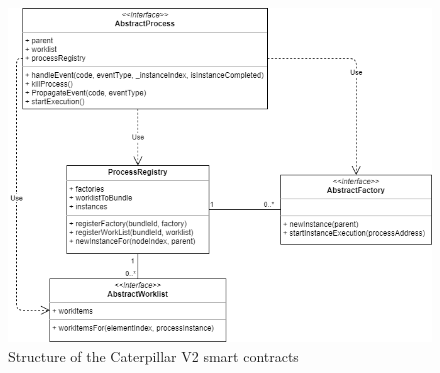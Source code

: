 \begin{figure}[hbt]
	\includegraphics[width=\textwidth]{gfx/caterpillar-compilation-contracts}
	\caption{Structure of the Caterpillar V2 smart contracts}
	\label{fig:caterpillar:v2:contracts}
\end{figure}

